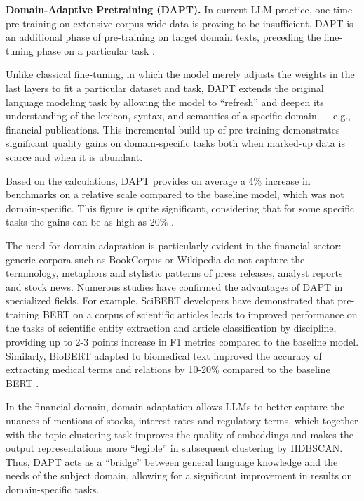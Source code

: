 \textbf{Domain-Adaptive Pretraining (DAPT).}  In current LLM practice, one-time pre-training
on extensive corpus-wide data is proving to be insufficient. DAPT is an additional phase
of pre-training on target domain texts, preceding the fine-tuning phase on a particular
task \parencite{gururangan2020DAPT}.

Unlike classical fine-tuning, in which the model merely adjusts the weights in the last
layers to fit a particular dataset and task, DAPT extends the original language modeling
task by allowing the model to “refresh” and deepen its understanding of the lexicon, syntax,
and semantics of a specific domain --- e.g., financial publications. This incremental build-up
of pre-training demonstrates significant quality gains on domain-specific tasks both when
marked-up data is scarce and when it is abundant.

Based on the calculations, DAPT provides on average a 4\% increase in benchmarks on a relative
scale compared to the baseline model, which was not domain-specific. This figure is quite significant,
considering that for some specific tasks the gains can be as high as 20\% \parencite{gururangan2020DAPT}.

The need for domain adaptation is particularly evident in the financial sector: generic corpora
such as BookCorpus \parencite{BookCorpus2015} or Wikipedia \parencite{WikiText2017} do not
capture the terminology, metaphors and stylistic patterns of press releases, analyst reports
and stock news. Numerous studies have confirmed the advantages of DAPT in specialized fields.
For example, SciBERT developers have demonstrated that pre-training BERT on a corpus
of scientific articles leads to improved performance on the tasks of scientific entity
extraction and article classification by discipline, providing up to 2-3 points increase
in F1 metrics compared to the baseline \parencite{SciBERT2019} model. Similarly, BioBERT adapted
to biomedical text improved the accuracy of extracting medical terms and relations by 10-20\%
compared to the baseline BERT \parencite{BioBERT2020}.

In the financial domain, domain adaptation allows LLMs to better capture the nuances of mentions
of stocks, interest rates and regulatory terms, which together with the topic clustering task
improves the quality of embeddings and makes the output representations more “legible” in subsequent
clustering by HDBSCAN. Thus, DAPT acts as a “bridge” between general language knowledge and the needs
of the subject domain, allowing for a significant improvement in results on domain-specific tasks.

